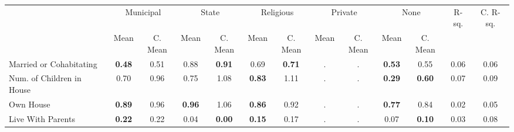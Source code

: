 \begin{tabular}{l c c c c c c c c c c c c}
\toprule
& \multicolumn{2}{c}{Municipal} & \multicolumn{2}{c}{State} & \multicolumn{2}{c}{Religious} & \multicolumn{2}{c}{Private} & \multicolumn{2}{c}{None} & R-sq. & C. R-sq. \\
& \scriptsize Mean & \scriptsize C. Mean & \scriptsize Mean & \scriptsize C. Mean & \scriptsize Mean & \scriptsize C. Mean & \scriptsize Mean & \scriptsize C. Mean & \scriptsize Mean & \scriptsize C. Mean & & \\
\midrule
Married or Cohabitating & \textbf{     0.48} & 0.51 &      0.88 & \textbf{     0.91} &      0.69 & \textbf{     0.71} &         . & . & \textbf{     0.53} & 0.55 &      0.06 &      0.06 \\
Num. of Children in House &      0.70 & 0.96 &      0.75 & 1.08 & \textbf{     0.83} & 1.11 &         . & . & \textbf{     0.29} & \textbf{     0.60} &      0.07 &      0.09 \\
Own House & \textbf{     0.89} & 0.96 & \textbf{     0.96} & 1.06 & \textbf{     0.86} & 0.92 &         . & . & \textbf{     0.77} & 0.84 &      0.02 &      0.05 \\
Live With Parents & \textbf{     0.22} & 0.22 &      0.04 & \textbf{     0.00} & \textbf{     0.15} & 0.17 &         . & . &      0.07 & \textbf{     0.10} &      0.03 &      0.08 \\
\bottomrule
\end{tabular}
